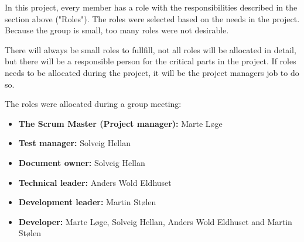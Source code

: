 In this project, every member has a role with the responsibilities described in the section above ("Roles").
The roles were selected based on the needs in the project. Because the group is small, too many roles were not desirable.

There will always be small roles to fullfill, not all roles will be allocated in detail, but there will be a responsible person for the critical parts in the project. If roles needs to be allocated during the project, it will be the project managers job to do so.

The roles were allocated during a group meeting:
\begin{itemize}
  \item {\bf The Scrum Master (Project manager):} Marte Løge
  \item {\bf Test manager:} Solveig Hellan
  \item {\bf Document owner:} Solveig Hellan
  \item {\bf Technical leader:} Anders Wold Eldhuset
  \item {\bf Development leader:} Martin Stølen
  \item {\bf Developer:} Marte Løge, Solveig Hellan, Anders Wold Eldhuset and Martin Stølen
\end{itemize}





